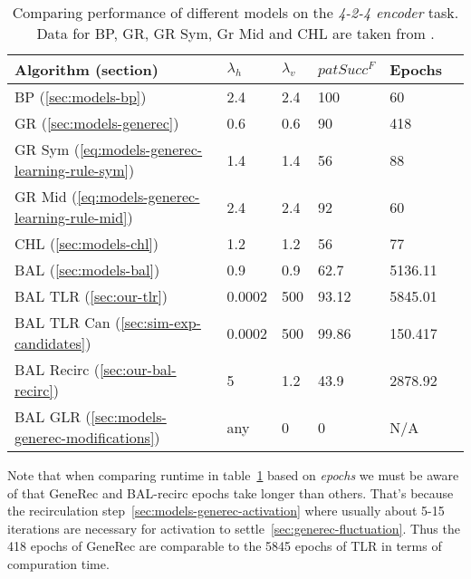 \begin{table}[H] 
  \centering
    \begin{tabular}{|l|l|l|l|l|l|}
    \hline
    Algorithm (section)&$\lambda_h$&$\lambda_v$&$patSucc^F$ &Epochs\\ %
    \hline
    BP (\ref{sec:models-bp}) &2.4 &2.4 &100&60\\ %
    \hline
    GR (\ref{sec:models-generec}) &0.6 &0.6 &90&418\\ %
    \hline
    GR Sym (\ref{eq:models-generec-learning-rule-sym}) &1.4 &1.4 &56&88\\ %
    \hline
    GR Mid (\ref{eq:models-generec-learning-rule-mid}) &2.4 &2.4 &92&60\\ %
    \hline
    CHL (\ref{sec:models-chl}) &1.2 &1.2 &56&77\\ %
    \hline
    BAL (\ref{sec:models-bal})&0.9 &0.9 &62.7& 5136.11\\ %
    \hline
    BAL TLR (\ref{sec:our-tlr})&0.0002  & 500&93.12&5845.01\\ %
    \hline
    BAL TLR Can (\ref{sec:sim-exp-candidates})&0.0002&500&99.86&150.417\\ %
    \hline
    BAL Recirc (\ref{sec:our-bal-recirc})&5&1.2&43.9&2878.92\\ %
    \hline
    BAL GLR (\ref{sec:models-generec-modifications})& any & 0 & 0 & N/A \\ 
    \hline 
    \end{tabular}
  \caption{Comparing performance of different models on the \emph{4-2-4 encoder} task. Data for BP, GR, GR Sym, Gr Mid and CHL are taken from \citet{o1996bio}.} 
  \label{tab:results-cmp-auto4}
\end{table}

Note that when comparing runtime in table~\ref{tab:results-cmp-auto4} based on \emph{epochs} we must be aware of that GeneRec and BAL-recirc epochs take longer than others. That's because the recirculation step~\ref{sec:models-generec-activation} where usually about 5-15 iterations are necessary for activation to settle~\ref{sec:generec-fluctuation}. Thus the 418 epochs of GeneRec are comparable to the 5845 epochs of TLR in terms of compuration time. 
